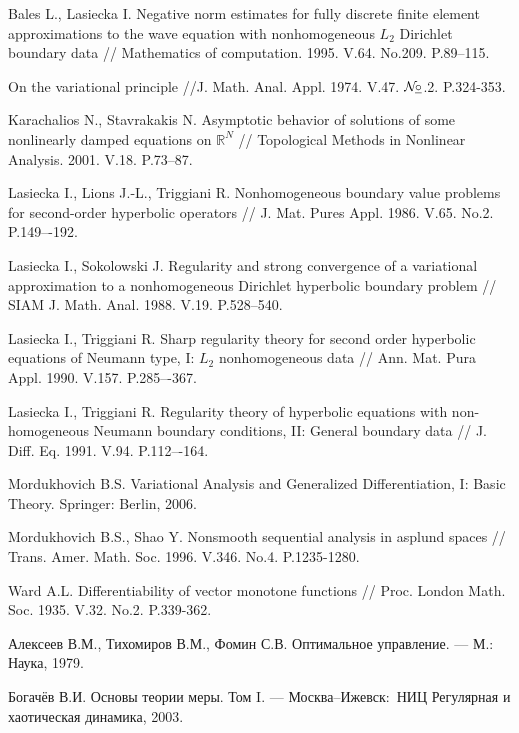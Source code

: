 \documentclass{report}
\newcommand{\No}{${\cal N}{\!}\underline{\circ}$}
\newcounter{lem}[section]
\newcounter{theor}[section]
\begin{document}
\begin{thebibliography}{99}

 Bales L., Lasiecka I. Negative norm estimates for fully discrete finite element approximations to the wave equation with nonhomogeneous $L_2$ Dirichlet boundary
data // Mathematics of computation. 1995. V.64. No.209. P.89--115.

 On the variational principle //J. Math. Anal. Appl. 1974. V.47. \No.2. P.324-353.

 Karachalios N., Stavrakakis N. Asymptotic behavior of solutions of some nonlinearly damped equations on $\mathbb{R}^N$ // Topological Methods in Nonlinear Analysis.
2001. V.18. P.73--87.

Lasiecka I., Lions J.-L., Triggiani R. Nonhomogeneous boundary value problems for second-order hyperbolic operators // J. Mat. Pures Appl. 1986. V.65. No.2.
P.149–-192.

Lasiecka I., Sokolowski J. Regularity and strong convergence of a variational approximation to a nonhomogeneous Dirichlet hyperbolic boundary problem //
SIAM J. Math. Anal. 1988. V.19. P.528–540.

Lasiecka I., Triggiani R. Sharp regularity theory for second order hyperbolic equations of Neumann type, I: $L_2$ nonhomogeneous data // Ann. Mat. Pura Appl.
1990. V.157. P.285–-367.

Lasiecka I., Triggiani R. Regularity theory of hyperbolic equations with non-homogeneous Neumann boundary conditions, II: General boundary data // J. Diff. Eq.
1991. V.94. P.112–-164.

 { Mordukhovich B.S.} Variational Analysis and Generalized Differentiation, I: Basic Theory. Springer: Berlin, 2006.

 {Mordukhovich B.S., Shao Y.} Nonsmooth sequential analysis in asplund spaces // Trans. Amer. Math. Soc. 1996. V.346. No.4. P.1235-1280.

 {Ward A.L. }Differentiability of vector monotone functions // Proc. London Math. Soc. 1935. V.32. No.2. P.339-362.

 Алексеев В.М., Тихомиров В.М., Фомин С.В. Оптимальное управление. --- М.: Наука, 1979.

 Богачёв В.И. Основы теории меры. Том I. --- Москва--Ижевск:\ НИЦ \glqq Регулярная и хаотическая динамика\grqq, 2003.


\end{thebibliography}
\end{document}
